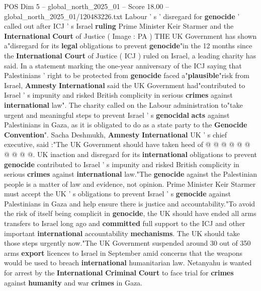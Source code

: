 \begin{textsample}{POS Dim 5 – global\_north\_2025\_01 – Score 18.00 – global\_north\_2025\_01/120483226.txt}  \label{ex:f5_pos_264}
Labour ' s ' disregard for \textbf{genocide} ' called out after ICJ ' s Israel \textbf{ruling} Prime Minister Keir Starmer and the \textbf{International} \textbf{Court} of Justice ( Image : PA ) THE UK Government has shown a"disregard for its \textbf{legal} obligations to prevent \textbf{genocide}"in the 12 months since the \textbf{International} \textbf{Court} of Justice ( ICJ ) ruled on Israel, a leading charity has said.
In a statement marking the one-year anniversary of the ICJ saying that Palestinians ' right to be protected from \textbf{genocide} faced a"\textbf{plausible}"risk from Israel, \textbf{Amnesty} \textbf{International} said the UK Government had"contributed to Israel ' s impunity and risked British complicity in serious \textbf{crimes} against \textbf{international} law".
The charity called on the Labour administration to"take urgent and meaningful steps to prevent Israel ' s \textbf{genocidal} \textbf{acts} against Palestinians in Gaza, as it is obligated to do as a state party to the \textbf{Genocide} \textbf{Convention}".
Sacha Deshmukh, \textbf{Amnesty} \textbf{International} UK ' s chief executive, said :"The UK Government should have taken heed of @ @ @ @ @ @ @ @ @ @.
UK inaction and disregard for its \textbf{international} obligations to prevent \textbf{genocide} contributed to Israel ' s impunity and risked British complicity in serious \textbf{crimes} against \textbf{international} law."The \textbf{genocide} against the Palestinian people is a matter of law and evidence, not opinion.
Prime Minister Keir Starmer must accept the UK ' s obligations to prevent Israel ' s \textbf{genocide} against Palestinians in Gaza and help ensure there is justice and accountability."To avoid the risk of itself being complicit in \textbf{genocide}, the UK should have ended all arms transfers to Israel long ago and \textbf{committed} full support to the ICJ and other important \textbf{international} accountability \textbf{mechanisms}.
The UK should take those steps urgently now."The UK Government suspended around 30 out of 350 arms \textbf{export} licences to Israel in September amid concerns that the weapons would be used to breach \textbf{international} humanitarian law.
Netanyahu is wanted for arrest by the \textbf{International} \textbf{Criminal} \textbf{Court} to face trial for \textbf{crimes} against \textbf{humanity} and war \textbf{crimes} in Gaza.

\end{textsample}
